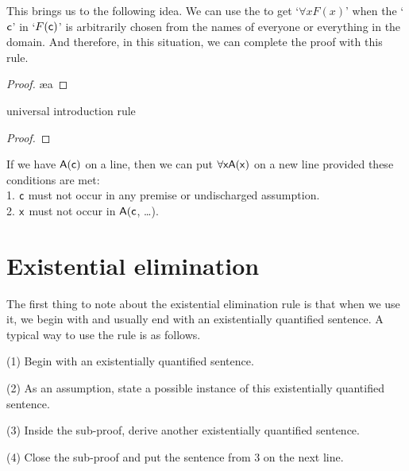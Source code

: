 This brings us to the following idea. We can use the  to get `$\forall x F(x)$' when the `$\mathsf{c}$' in `$F(\mathsf{c})$' is arbitrarily chosen from the names of everyone or everything in the domain. And therefore, in this situation, we can complete the proof with this rule.

\begin{proof}
	 \pr{}
	 
	 \ae{a}
	 
\end{proof}

\begin{factboxy}{universal introduction rule}
\begin{proof}
	 
\end{proof}

\small{If we have $\mathsf{A(c)}$ on a line, then we can put $\forall \mathsf{xA(x)}$ on a new line provided these conditions are met:\\
1. $\mathsf{c}$ must not occur in any premise or undischarged assumption.\\
2. $\mathsf{x}$ must not occur in $\mathsf{A(c}$, \ldots).
}
\end{factboxy}


\section{Existential elimination}

The first thing to note about the existential elimination rule is that when we use it, we begin with and usually end with an existentially quantified sentence. A typical way to use the rule is as follows. 

\begin{ebullet}
\item[(1)] Begin with an existentially quantified sentence. 
\item[(2)] As an assumption, state a possible instance of this existentially quantified sentence. 
\item[(3)] Inside the sub-proof, derive another existentially quantified sentence.
\item[(4)] Close the sub-proof and put the sentence from 3 on the next line. 
\end{ebullet}

